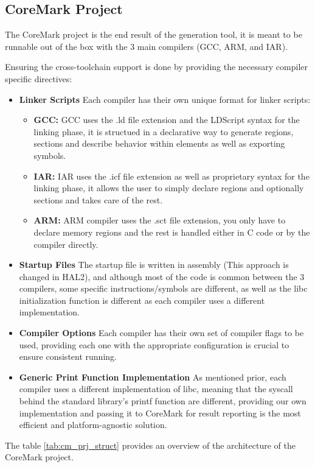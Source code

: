 \subsection{CoreMark Project}
The CoreMark project is the end result of the generation tool, it is meant to be runnable out of the box with the 3 main compilers (GCC, ARM, and IAR).

Ensuring the cross-toolchain support is done by providing the necessary compiler specific directives:
\begin{itemize}
	\item \textbf{Linker Scripts}
	Each compiler has their own unique format for linker scripts:
	\begin{itemize}
		\item \textbf{GCC:} GCC uses the .ld file extension and the LDScript syntax for the linking phase, it is structued in a declarative way to generate regions, sections and describe behavior within elements as well as exporting symbols.
		\item \textbf{IAR:} IAR uses the .icf file extension as well as proprietary syntax for the linking phase, it allows the user to simply declare regions and optionally sections and takes care of the rest.
		\item \textbf{ARM:} ARM compiler uses the .sct file extension, you only have to declare memory regions and the rest is handled either in C code or by the compiler directly.
	\end{itemize}
	\item \textbf{Startup Files} The startup file is written in assembly (This approach is changed in HAL2), and although most of the code is common between the 3 compilers, some specific instructions/symbols are different, as well as the libc initialization function is different as each compiler uses a different implementation.
	\item \textbf{Compiler Options} Each compiler has their own set of compiler flags to be used, providing each one with the appropriate configuration is crucial to ensure consistent running.
	\item \textbf{Generic Print Function Implementation} As mentioned prior, each compiler uses a different implementation of libc, meaning that the syscall behind the standard library's printf function are different, providing our own implementation and passing it to CoreMark for result reporting is the most efficient and platform-agnostic solution.
\end{itemize}
The table \ref{tab:cm_prj_struct} provides an overview of the architecture of the CoreMark project.
